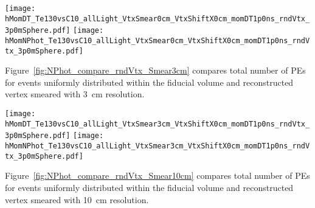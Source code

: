 \begin{figure*}[ht]
  \centering
  \texttt{[image: hMomDT\_Te130vsC10\_allLight\_VtxSmear0cm\_VtxShiftX0cm\_momDT1p0ns\_rndVtx\_3p0mSphere.pdf]}
  \texttt{[image: hMomNPhot\_Te130vsC10\_allLight\_VtxSmear0cm\_VtxShiftX0cm\_momDT1p0ns\_rndVtx\_3p0mSphere.pdf]}
  \caption{(Left) Difference between measured PE arrival time and arrival time prediction based on 
	vertex location (T$^{predicted} = |r_{hit} - r_{vtx}|/v_{phot}$, where $v_phot = c/1.53$).
        $\vbb$-decay (black solid line) and $\Cten$ events (magenta dashed line) are compared. 
	Vertical line at 1~ns indicates cut for early light selection. 
        (Right) Total number of PEs in the early light sample. 
        $^{10}$C events with energy deposition in the range between 2.1 and 2.9~MeV are
	selected. Verticies are uniformly distributed within the fiducial volume, $R<3$~m.
        {\bf Perfect vertex reconstruction - true vertex position is used.}}
\label{fig:NPhot_compare_rndVtx_noSmear}
\end{figure*}


Figure~\ref{fig:NPhot_compare_rndVtx_Smear3cm} compares total number of PEs for events uniformly
distributed within the fiducial volume and reconstructed vertex smeared with 3~cm resolution.

\begin{figure*}[ht]
  \centering
  \texttt{[image: hMomDT\_Te130vsC10\_allLight\_VtxSmear3cm\_VtxShiftX0cm\_momDT1p0ns\_rndVtx\_3p0mSphere.pdf]}
  \texttt{[image: hMomNPhot\_Te130vsC10\_allLight\_VtxSmear3cm\_VtxShiftX0cm\_momDT1p0ns\_rndVtx\_3p0mSphere.pdf]}
  \caption{(Left) Difference between measured PE arrival time and arrival time prediction based on
        vertex location (T$^{predicted} = |r_{hit} - r_{vtx}|/v_{phot}$, where $v_phot = c/1.53$).
        $\vbb$-decay (black solid line) and $\Cten$ events (magenta dashed line) are compared.
        Vertical line at 1~ns indicates cut for early light selection.
        (Right) Total number of PEs in the early light sample.
        $^{10}$C events with energy deposition in the range between 2.1 and 2.9~MeV are
        selected. Verticies are uniformly distributed within the fiducial volume, $R<3$~m.
        {\bf Vetrex is smeared with 3~cm resolution.}}
\label{fig:NPhot_compare_rndVtx_Smear3cm}
\end{figure*}


Figure~\ref{fig:NPhot_compare_rndVtx_Smear10cm} compares total number of PEs for events uniformly
distributed within the fiducial volume and reconstructed vertex smeared with 10~cm resolution.

